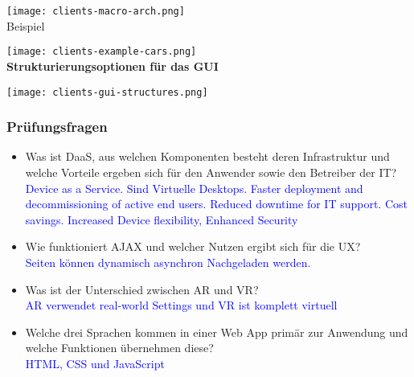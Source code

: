 \texttt{[image: clients-macro-arch.png]} \\

Beispiel

\texttt{[image: clients-example-cars.png]} \\

\textbf{Strukturierungsoptionen für das GUI}

\texttt{[image: clients-gui-structures.png]}

\columnbreak
\subsubsection{Prüfungsfragen}

\begin{itemize}
    \item Was ist DaaS, aus welchen Komponenten besteht deren Infrastruktur und welche Vorteile ergeben sich für den Anwender sowie den Betreiber der IT? \\
    \textcolor{blue}{Device as a Service. Sind Virtuelle Desktops. Faster deployment and decommissioning of active end users. Reduced downtime for IT support. Cost savings. Increased Device flexibility, Enhanced Security}
    \item Wie funktioniert AJAX und welcher Nutzen ergibt sich für die UX? \\
    \textcolor{blue}{Seiten können dynamisch asynchron Nachgeladen werden.}
    \item Was ist der Unterschied zwischen AR und VR? \\
    \textcolor{blue}{AR verwendet real-world Settings und VR ist komplett virtuell}
    \item Welche drei Sprachen kommen in einer Web App primär zur Anwendung und welche Funktionen übernehmen diese? \\
    \textcolor{blue}{HTML, CSS und JavaScript}
\end{itemize}
